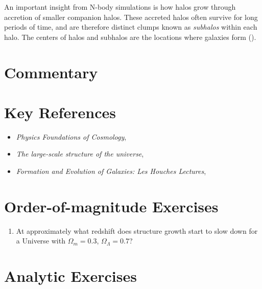 An important insight from N-body simulations is how halos grow through
accretion of smaller companion halos. These accreted halos often
survive for long periods of time, and are therefore distinct clumps
known as {\it subhalos} within each halo. The centers of halos and
subhalos are the locations where galaxies form (\citealt{wechsler18a}).

\section{Commentary}


\section{Key References}

\begin{itemize}
  \item
    {\it Physics Foundations of Cosmology},
    \citet{mukhanov05a}
  \item
    {\it The large-scale structure of the
    universe}, \citet{peebles80a}
  \item
    {\it Formation and Evolution of Galaxies: Les Houches
    Lectures}, \citet{white94a} 
\end{itemize}

\section{Order-of-magnitude Exercises}

\begin{enumerate} 
\item At approximately what redshift does structure growth start to
    slow down for a Universe with $\Omega_m = 0.3$, $\Omega_\Lambda = 0.7$?
\end{enumerate} 

\section{Analytic Exercises}

